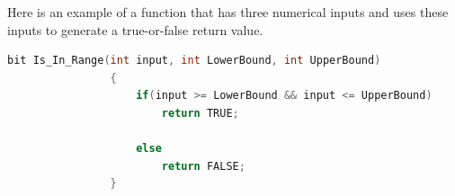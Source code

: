         Here is an example of a function that has three numerical inputs and uses these inputs to generate a true-or-false return value.
            
            \begin{lstlisting}[style=mystyle_c, language=c, breaklines]
                bit Is_In_Range(int input, int LowerBound, int UpperBound)
                {
                    if(input >= LowerBound && input <= UpperBound)
                        return TRUE;
                
                    else
                        return FALSE;
                }
            \end{lstlisting}
